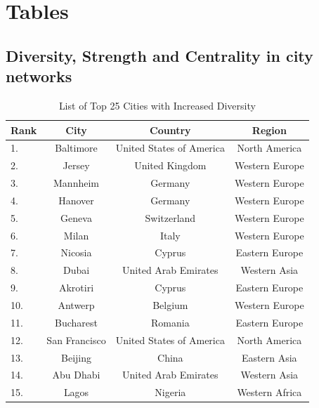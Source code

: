 
\chapter{Tables}
\label{chp:tables}

\section{Diversity, Strength and Centrality in city networks}
\label{sec:appendix-B-city-networks}

\begin{table}[h]
	\centering
	\caption{List of Top 25 Cities with Increased Diversity}
	\begin{scriptsize}
	\begin{tabular}{|l|c|c|c|}
	\hline \textbf{Rank} & \textbf{City} & \textbf{Country} & \textbf{Region}  			\\   
	\hline 
	 1. & Baltimore         & United States of America 			& North America 		\\	
	 2. & Jersey      		& United Kingdom 					& Western Europe  		\\	
	 3. & Mannheim 			& Germany 							& Western Europe  		\\	
	 4. & Hanover 			& Germany 							& Western Europe 		\\	
	 5. & Geneva 			& Switzerland 						& Western Europe 		\\	
	 6. & Milan 			& Italy 							& Western Europe 		\\	
	 7. & Nicosia 			& Cyprus 							& Eastern Europe 		\\	
	 8. & Dubai 			& United Arab Emirates 				& Western Asia			\\	
	 9. & Akrotiri 			& Cyprus 							& Eastern Europe		\\	
	 10. & Antwerp 			& Belgium 							& Western Europe		\\	
	 11. & Bucharest 		& Romania 							& Eastern Europe		\\	
	 12. & San Francisco 	& United States of America 			& North America			\\	
	 13. & Beijing 			& China 							& Eastern Asia  		\\	
	 14. & Abu Dhabi	 	& United Arab Emirates 				& Western Asia			\\ 
	 15. & Lagos  			& Nigeria 							& Western Africa		\\ 				

\end{tabular}
\end{scriptsize}
\end{table}
